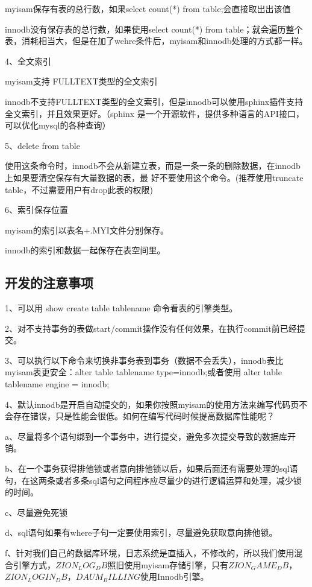 \documentclass[UTF8]{ctexart}
\begin{document}
myisam保存有表的总行数，如果select count(*) from table;会直接取出出该值

innodb没有保存表的总行数，如果使用select count(*) from table；就会遍历整个表，消耗相当大，但是在加了wehre条件后，myisam和innodb处理的方式都一样。

4、全文索引

myisam支持 FULLTEXT类型的全文索引

innodb不支持FULLTEXT类型的全文索引，但是innodb可以使用sphinx插件支持全文索引，并且效果更好。（sphinx   是一个开源软件，提供多种语言的API接口，可以优化mysql的各种查询）

5、delete from table

使用这条命令时，innodb不会从新建立表，而是一条一条的删除数据，在innodb上如果要清空保存有大量数据的表，最       好不要使用这个命令。(推荐使用truncate table，不过需要用户有drop此表的权限)

6、索引保存位置

myisam的索引以表名+.MYI文件分别保存。

innodb的索引和数据一起保存在表空间里。

\subsection{开发的注意事项}

1、可以用 show create table tablename 命令看表的引擎类型。

2、对不支持事务的表做start/commit操作没有任何效果，在执行commit前已经提交。

3、可以执行以下命令来切换非事务表到事务（数据不会丢失），innodb表比myisam表更安全：alter table tablename type=innodb;或者使用 alter table tablename engine = innodb;

4、默认innodb是开启自动提交的，如果你按照myisam的使用方法来编写代码页不会存在错误，只是性能会很低。如何在编写代码时候提高数据库性能呢？

a、尽量将多个语句绑到一个事务中，进行提交，避免多次提交导致的数据库开销。

b、在一个事务获得排他锁或者意向排他锁以后，如果后面还有需要处理的sql语句，在这两条或者多条sql语句之间程序应尽量少的进行逻辑运算和处理，减少锁的时间。

c、尽量避免死锁

d、sql语句如果有where子句一定要使用索引，尽量避免获取意向排他锁。

f、针对我们自己的数据库环境，日志系统是直插入，不修改的，所以我们使用混合引擎方式，$ZION_LOG_DB$照旧使用myisam存储引擎，只有$ZION_GAME_DB$，$ZION_LOGIN_DB$，$DAUM_BILLING$使用Innodb引擎。
\end{document}

